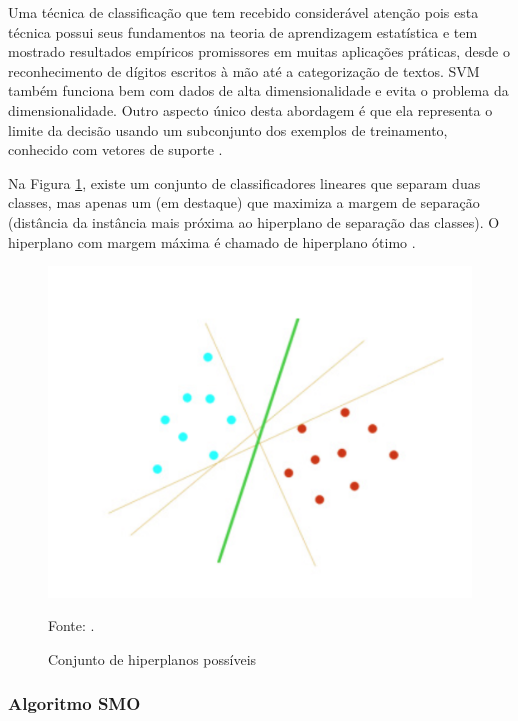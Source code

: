 \documentclass[
	12pt,				%
	openright,			%
	oneside,	
	a4paper,				%
	english,				%
	brazil				%
]{abntex2/abntex2} %
\begin{document}
	Uma técnica de classificação que tem recebido considerável atenção pois esta técnica possui seus fundamentos na teoria de aprendizagem estatística e tem mostrado resultados empíricos promissores em muitas aplicações práticas, desde o reconhecimento de dígitos escritos à mão até a categorização de textos. SVM também funciona bem com dados de alta dimensionalidade e evita o problema da dimensionalidade. Outro aspecto único desta abordagem é que ela representa o limite da decisão usando um subconjunto dos exemplos de treinamento, conhecido com vetores de suporte \cite{tan:2009}.
	
	Na Figura \ref{figsvmHiperPlanos}, existe um conjunto de classificadores lineares que separam duas classes, mas apenas um (em destaque) que maximiza a margem de separação (distância da instância mais próxima ao hiperplano de separação das classes). O hiperplano com margem máxima é chamado de hiperplano ótimo \cite{junior:2010}.
	
	\begin{figure}[H]
		\caption{\label{figsvmHiperPlanos} Conjunto de hiperplanos possíveis}
		\begin{center}
			\includegraphics[scale=0.5]{img/svmHiperPlanos.png}
		\end{center}
		Fonte: \cite{junior:2010}.
	\end{figure}
	
	
	\subsubsection{Algoritmo SMO}
	
\end{document}

